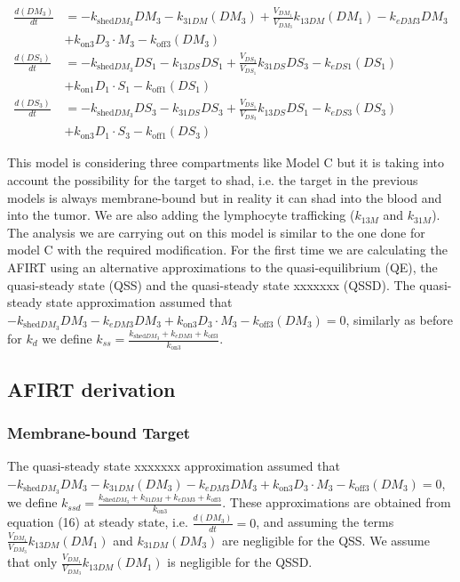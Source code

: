 \begin{align}
\frac{d(DM_3)}{dt} &= -k_{\text{shed}DM_3}DM_3 - k_{31DM}(DM_3) + \frac{V_{DM_1}}{V_{DM_3}}k_{13DM}(DM_1)  - k_{eDM3}DM_3\nonumber \\&+k_{\text{on}3}D_3 \cdot M_3 - k_{\text{off}3}(DM_3)  \\
\frac{d(DS_1)}{dt} &=-k_{\text{shed}DM_3}DS_1  - k_{13DS}DS_1 + \frac{V_{DS_3}}{V_{DS_1}}k_{31DS}DS_3 - k_{eDS1}(DS_1)  \nonumber\\ &+ k_{\text{on}1}D_1 \cdot S_1 - k_{\text{off}1}(DS_1)  \\
\frac{d(DS_3)}{dt} &=-k_{\text{shed}DM_3}DS_3  - k_{31DS}DS_3 + \frac{V_{DS_1}}{V_{DS_3}}k_{13DS}DS_1 - k_{eDS3}(DS_3)  \nonumber\\ &+ k_{\text{on}3}D_1 \cdot S_3 - k_{\text{off}1}(DS_3)  
\end{align}

This model is considering three compartments like Model C but it is taking into account the possibility for the target to shad, i.e. the target in the previous models is always membrane-bound but in reality it can shad into the blood and into the tumor. We are also adding the lymphocyte trafficking ($k_{13M}$ and $k_{31M}$).
The analysis we are carrying out on this model is similar to the one done for model C with the required modification. For the first time we are calculating the AFIRT using an alternative approximations to the quasi-equilibrium (QE), the quasi-steady state (QSS) and the quasi-steady state xxxxxxx (QSSD). The quasi-steady state approximation assumed that $-k_{\text{shed}DM_3}DM_3 - k_{eDM3}DM_3+k_{\text{on}3}D_3 \cdot M_3 - k_{\text{off}3}(DM_3) = 0 $, similarly as before for $k_d$ we define $k_{ss}=\frac{k_{\text{shed}DM_3} + k_{eDM3}+ k_{\text{off}3}}{k_{\text{on}3}}$. 

\subsection{AFIRT derivation}

\subsubsection{Membrane-bound Target}

The quasi-steady state xxxxxxx approximation assumed that $-k_{\text{shed}DM_3}DM_3-k_{31DM}(DM_3) - k_{eDM3}DM_3+k_{\text{on}3}D_3 \cdot M_3 - k_{\text{off}3}(DM_3) = 0 $, we define $k_{ssd}=\frac{k_{\text{shed}DM_3} +k_{31DM}+ k_{eDM3}+ k_{\text{off}3}}{k_{\text{on}3}}$. 
These approximations are obtained from equation (16) at steady state, i.e. $\frac{d(DM_3)}{dt}=0$, and assuming the terms $ \frac{V_{DM_1}}{V_{DM_3}}k_{13DM}(DM_1)$ and $ k_{31DM}(DM_3) $ are negligible for the QSS. We assume that only $\frac{V_{DM_1}}{V_{DM_3}}k_{13DM}(DM_1)$ is negligible for the QSSD. 

